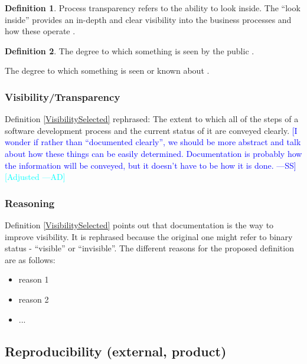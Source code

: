 \documentclass[letterpaper, cleveref]{lipics-v2019}
\newcommand{\authornote}[3]{\textcolor{#1}{[#3 ---#2]}}
\newcommand{\authornote}[3]{}
\newcommand{\wss}[1]{\authornote{blue}{SS}{#1}} %
\newcommand{\ad}[1]{\authornote{cyan}{AD}{#1}} %
\newcommand{\notdone}[1]{\textcolor{red}{#1}}
\theoremstyle{definition}
\newtheorem{defn}{Definition}
\begin{document}
\begin{defn}
  Process transparency refers to the ability to look inside. The “look inside”
  provides an in-depth and clear visibility into the business processes and how
  these operate \citep{PRIME2019}.
\end{defn}

\begin{defn}
The degree to which something is seen by the public
\citep{CambridgeVisibility2019}.
	
The degree to which something is seen or known about
\citep{CambridgeVisibility2019}.
\end{defn}

\begin{mybox}
\subsubsection*{Visibility/Transparency} 
Definition \ref{VisibilitySelected} rephrased: The extent to which all of the
steps of a software development process and the current status of it are
conveyed clearly. \wss{I wonder if rather than ``documented clearly'', we should
be more abstract and talk about how these things can be easily determined.
Documentation is probably how the information will be conveyed, but it doesn't
have to be how it is done.}  \ad{Adjusted}
\end{mybox}

\subsubsection*{Reasoning}

Definition \ref{VisibilitySelected} points out that documentation is the way to
improve visibility. It is rephrased because the original one might refer to
binary status - ``visible'' or ``invisible''.  The different reasons for the
proposed definition are as follows:

\begin{itemize}
  \item reason 1
  \item reason 2
  \item ...
\end{itemize}


\subsection{Reproducibility (external, product)} %
\end{document}
